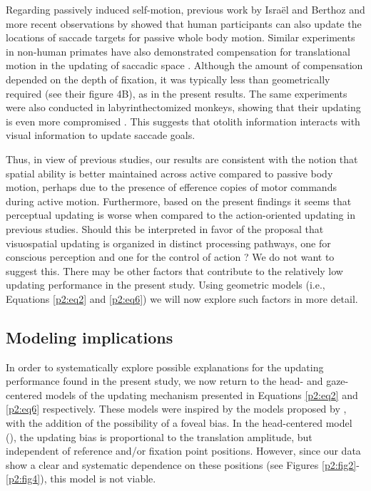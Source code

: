 Regarding passively induced self-motion, previous work by Isra\"el and Berthoz \nocite{israel1989} and more recent observations by  showed that human participants can also update the locations of saccade targets for passive whole body motion. Similar experiments in non-human primates have also demonstrated compensation for translational motion in the updating of saccadic space \cite{li2005a}. Although the amount of compensation depended on the depth of fixation, it was typically less than geometrically required (see their figure 4B), as in the present results. The same experiments were also conducted in labyrinthectomized monkeys, showing that their updating is even more compromised \cite{li2005b, wei2006}. This suggests that otolith information interacts with visual information to update saccade goals.

Thus, in view of previous studies, our results are consistent with the notion that spatial ability is better maintained across active compared to passive body motion, perhaps due to the presence of efference copies of motor commands during active motion. Furthermore, based on the present findings it seems that perceptual updating is worse when compared to the action-oriented updating in previous studies. Should this be interpreted in favor of the proposal that visuospatial updating is organized in distinct processing pathways, one for conscious perception and one for the control of action \cite{goodale1992}? We do not want to suggest this. There may be other factors that contribute to the relatively low updating performance in the present study. Using geometric models (i.e., Equations \ref{p2:eq2} and \ref{p2:eq6}) we will now explore such factors in more detail.

\subsection{Modeling implications}

In order to systematically explore possible explanations for the updating performance found in the present study, we now return to the head- and gaze-centered models of the updating mechanism presented in Equations \ref{p2:eq2} and \ref{p2:eq6} respectively. These models were inspired by the models proposed by , with the addition of the possibility of a foveal bias. In the head-centered model (), the updating bias is proportional to the translation amplitude, but independent of reference and/or fixation point positions. However, since our data show a clear and systematic dependence on these positions (see Figures \ref{p2:fig2}-\ref{p2:fig4}), this model is not viable.

